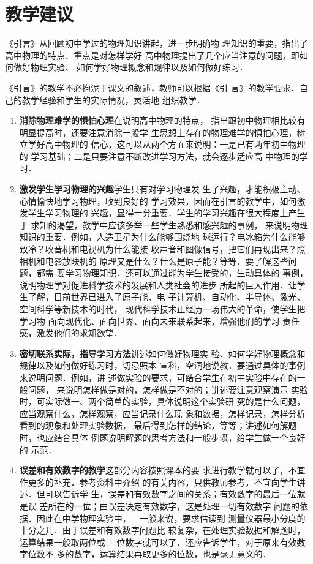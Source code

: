\section{教学建议}
《引言》从回顾初中学过的物理知识讲起，进一步明确物
理知识的重要，指出了高中物理的特点．重点是对怎样学好
高中物理提出了几个应当注意的问题，即如何做好物理实验、
如何学好物理概念和规律以及如何做好练习．

《引言》的教学不必拘泥于课文的叙述，教师可以根据《引
言》的教学要求、自己的教学经验和学生的实际情况，灵活地
组织教学．

\begin{enumerate}
    \item \textbf{消除物理难学的惧怕心理}\quad  在说明高中物理的特点，
指出跟初中物理相比较有明显提高时，还要注意消除一般学
生思想上存在的物理难学的惧怕心理，树立学好高中物理的
信心，这可以从两个方面来说明：一是已有两年初中物理的
学习基础；二是只要注意不断改进学习方法，就会逐步适应高
中物理的学习．
\item \textbf{激发学生学习物理的兴趣}\quad  学生只有对学习物理发
生了兴趣，才能积极主动、心情愉快地学习物理，收到良好的
学习效果，因而在引言的教学中，如何激发学生学习物理的
兴趣，显得十分重要．学生的学习兴趣在很大程度上产生于
求知的渴望，教学中应该多举一些学生熟悉和感兴趣的事例，
来说明物理知识的重要．例如，人造卫星为什么能够围绕地
球运行？电冰箱为什么能够致冷？收音机和电视机为什么能接
收声音和图像信号，把它们再现出来？照相机和电影放映机的
原理又是什么？什么是原子能？等等．要了解这些问题，都需
要学习物理知识．还可以通过能为学生接受的，生动具体的
事例，说明物理学对促进科学技术的发展和人类社会的进步
所起的巨大作用．让学生了解，目前世界已进入了原子能、电
子计算机、自动化、半导体、激光、空间科学等新技术的时代，
现代科学技术正经历一场伟大的革命，使学生把学习物
面向现代化、面向世界、面向未来联系起来，增强他们的学习
责任感，激发他们的求知欲望．
\item \textbf{密切联系实际，指导学习方法}\quad  讲述如何做好物理实
验、如何学好物理概念和规律以及如何做好练习时，切忌照本
宣科，空洞地说教．要通过具体的事例来说明问题．例如，讲
述做实验的要求，可结合学生在初中实验中存在的一般问题，
来说明怎样做是对的，怎样做是不对的；讲述要注意观察演示
实验时，可实际做一、两个简单的实验，具体说明这个实验研
究的是什么问题，应当观察什么，怎样观察，应当记录什么现
象和数据，怎样记录，怎样分析看到的现象和处理实验数据，
最后得到怎样的结论，等等；讲述如何解题时，也应结合具体
例题说明解题的思考方法和一般步骤，给学生做一个良好的
示范．
\item \textbf{误差和有效数字的教学}\quad  这部分内容按照课本的要
求进行教学就可以了，不宜作更多的补充．参考资料中介绍
的有关内容，只供教师参考，不宜向学生讲述．但可以告诉学
生，误差和有效数字之间的关系；有效数字的最后一位就是误
差所在的一位；由误差决定有效数字，这是处理一切有效数字
问题的依据．因此在中学物理实验中，－一般来说，要求估读到
测量仪器最小分度的十分之几．由于误差和有效数字问题比
较复杂，在处理实验数据和解题时，运算结果一般取两位或三
位数字就可以了．还应告诉学生，对于原来有效数字位数不
多的数字，运算结果再取更多的位数，也是毫无意义的．
\end{enumerate}


